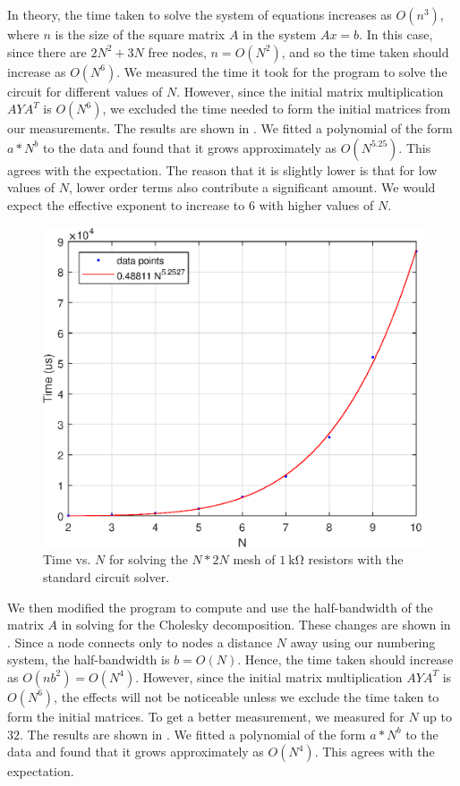 \documentclass[journal,hidelinks]{IEEEtran}
\begin{document}
In theory, the time taken to solve the system of equations increases as $O(n^3)$, where $n$ is the size of the square matrix $A$ in the system $A x = b$. In this case, since there are $2N^2 + 3N$ free nodes, $n = O(N^2)$, and so the time taken should increase as $O(N^6)$. We measured the time it took for the program to solve the circuit for different values of $N$. However, since the initial matrix multiplication $A Y A^T$ is $O(N^6)$, we excluded the time needed to form the initial matrices from our measurements. The results are shown in . We fitted a polynomial of the form $a * N ^ b$ to the data and found that it grows approximately as $O(N^{5.25})$. This agrees with the expectation. The reason that it is slightly lower is that for low values of $N$, lower order terms also contribute a significant amount. We would expect the effective exponent to increase to $6$ with higher values of $N$.

\begin{figure}[!htb]
  \centering
  \includegraphics[width=0.6\columnwidth]{question-2/standard_time.eps}
  \caption{Time vs. $N$ for solving the $N * 2N$ mesh of $\SI{1}{\kilo\ohm}$ resistors with the standard circuit solver.}
  \label{fig:q2-std-time}
\end{figure}

We then modified the program to compute and use the half-bandwidth of the matrix $A$ in solving for the Cholesky decomposition. These changes are shown in . Since a node connects only to nodes a distance $N$ away using our numbering system, the half-bandwidth is $b = O(N)$. Hence, the time taken should increase as $O(n b^2)  = O(N^4)$. However, since the initial matrix multiplication $A Y A^T$ is $O(N^6)$, the effects will not be noticeable unless we exclude the time taken to form the initial matrices. To get a better measurement, we measured for $N$ up to $32$. The results are shown in . We fitted a polynomial of the form $a * N ^ b$ to the data and found that it grows approximately as $O(N^4)$. This agrees with the expectation.
\end{document}
